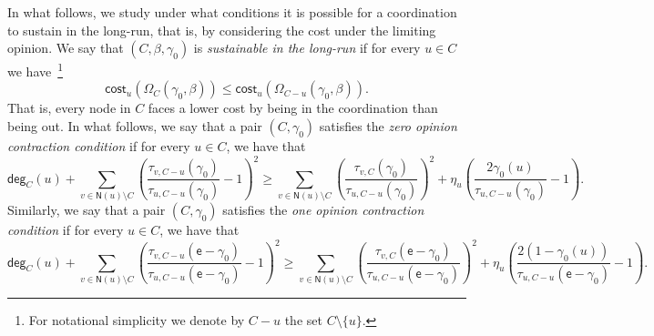\documentclass[letterpaper,11pt]{article}
\newcommand{\EE}{\mathsf{E}}
\newcommand{\nsf}{\mathsf{N}}
\newcommand{\cost}{\mathsf{cost}}
\newcommand{\degsf}{\mathsf{deg}}
\newcommand{\vvcom}[1]{\todo[color=red!25!white]{Victor: #1}}
\begin{document}
In what follows, we study under what conditions it is possible for a coordination to sustain in the long-run, that is, by considering the cost under the limiting opinion.
We say that $(C,\beta,\gamma_0)$ is {\it sustainable in the long-run} if for every $u\in C$ we have~\footnote{For notational simplicity we denote by $C-u$ the set $C\setminus \{u\}$.} 
\begin{equation*}
\cost_u(\Omega_C(\gamma_0,\beta))\le \cost_u(\Omega_{C-u}(\gamma_0,\beta)).
\end{equation*}
That is, every node in $C$ faces a lower cost by being in the coordination than being out.
In what follows, we say that a pair $(C,\gamma_0)$ satisfies the {\it zero opinion contraction condition} if for every $u\in C$, we have that 
\begin{equation*}
\degsf_C(u) + \sum_{v\in \nsf(u)\setminus C}\left(\frac{\tau_{v,C-u}(\gamma_0)}{\tau_{u,C-u}(\gamma_0)}-1\right)^2\ge \sum_{v\in \nsf(u)\setminus C}\left(\frac{\tau_{v,C}(\gamma_0)}{\tau_{u,C-u}(\gamma_0)}\right)^2+\eta_u\left(\frac{2\gamma_0(u)}{\tau_{u,C-u}(\gamma_0)}-1\right).
\end{equation*}
Similarly, we say that a pair $(C,\gamma_0)$ satisfies the {\it one opinion contraction condition} if for every $u\in C$, we have that 
\begin{equation*}
\degsf_C(u) + \sum_{v\in \nsf(u)\setminus C}\left(\frac{\tau_{v,C-u}(\mathsf{e}-\gamma_0)}{\tau_{u,C-u}(\mathsf{e}-\gamma_0)}-1\right)^2\ge \sum_{v\in \nsf(u)\setminus C}\left(\frac{\tau_{v,C}(\mathsf{e}-\gamma_0)}{\tau_{u,C-u}(\mathsf{e}-\gamma_0)}\right)^2+\eta_u\left(\frac{2(1-\gamma_0(u))}{\tau_{u,C-u}(\mathsf{e}-\gamma_0)}-1\right).
\end{equation*}
\end{document}
